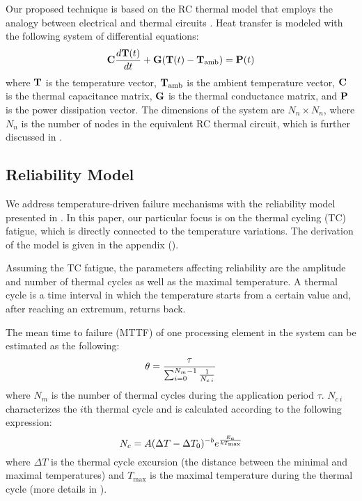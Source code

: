 Our proposed technique is based on the RC thermal model that employs the analogy
between electrical and thermal circuits \cite{kreith2000}. Heat transfer is
modeled with the following system of differential equations:
\begin{equation} \elab{fourier-model}
  \m{C} \frac{d\v{T}(t)}{dt} + \m{G} (\v{T}(t) - \v{T}_\text{amb}) = \v{P}(t)
\end{equation}
where $\mathbf{T}$ is the temperature vector, $\mathbf{T}_\text{amb}$ is the ambient
temperature vector, $\mathbf{C}$ is the thermal capacitance matrix, $\mathbf{G}$ is the
thermal conductance matrix, and $\mathbf{P}$ is the power dissipation vector. The
dimensions of the system are \mbox{$N_n \times N_n$}, where $N_n$ is the number
of nodes in the equivalent RC thermal circuit, which is further discussed in
.

\subsection{Reliability Model} 

We address temperature-driven failure mechanisms with the reliability model
presented in \cite{huang2009, xiang2010}. In this paper, our particular focus is
on the thermal cycling (TC) fatigue, which is directly connected to the
temperature variations. The derivation of the model is given in the appendix
().

Assuming the TC fatigue, the parameters affecting reliability are the amplitude
and number of thermal cycles as well as the maximal temperature. A thermal cycle
is a time interval in which the temperature starts from a certain value and,
after reaching an extremum, returns back.

The mean time to failure (MTTF) of one processing element in the system can be
estimated as the following:
\begin{align} \elab{one-mttf}
  \theta = \frac{\tau}{\sum_{i=0}^{N_m - 1} \frac{1}{N_{c \: i}}}
\end{align}
where $N_m$ is the number of thermal cycles during the application period
$\tau$. $N_{c \: i}$ characterizes the $i$th thermal cycle and is calculated
according to the following expression:
\begin{equation} \elab{cycles-to-failure}
  N_c = A (\Delta T - \Delta T_0)^{-b} e^{\frac{E_a}{k T_\text{max}}}
\end{equation}
where $\Delta T$ is the thermal cycle excursion (the distance between the
minimal and maximal temperatures) and $T_\text{max}$ is the maximal temperature
during the thermal cycle (more details in ).

